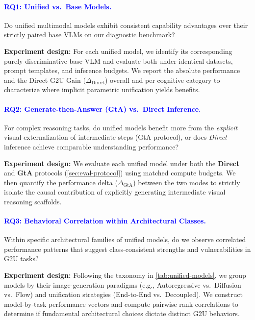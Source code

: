 \documentclass{article}
\theoremstyle{plain}
\theoremstyle{definition}
\theoremstyle{remark}
\begin{document}
\paragraph{\textcolor{blue}{RQ1: Unified vs.\ Base Models.}}
Do unified multimodal models exhibit consistent capability advantages over their strictly paired base VLMs on our diagnostic benchmark?
\par\noindent\textbf{Experiment design:} For each unified model, we identify its corresponding purely discriminative base VLM and evaluate both under identical datasets, prompt templates, and inference budgets. We report the absolute performance and the Direct G2U Gain ($\Delta_{\mathrm{Direct}}$) overall and per cognitive category to characterize where implicit parametric unification yields benefits.

\paragraph{\textcolor{blue}{RQ2: Generate-then-Answer (GtA) vs.\ Direct Inference.}}
For complex reasoning tasks, do unified models benefit more from the \emph{explicit} visual externalization of intermediate steps (GtA protocol), or does \emph{Direct} inference achieve comparable understanding performance?
\par\noindent\textbf{Experiment design:} We evaluate each unified model under both the \textbf{Direct} and \textbf{GtA} protocols (\cref{sec:eval-protocol}) using matched compute budgets. We then quantify the performance delta ($\Delta_{\mathrm{GtA}}$) between the two modes to strictly isolate the causal contribution of explicitly generating intermediate visual reasoning scaffolds.

\paragraph{\textcolor{blue}{RQ3: Behavioral Correlation within Architectural Classes.}}
Within specific architectural families of unified models, do we observe correlated performance patterns that suggest class-consistent strengths and vulnerabilities in G2U tasks?
\par\noindent\textbf{Experiment design:} Following the taxonomy in \cref{tab:unified-models}, we group models by their image-generation paradigms (e.g., Autoregressive vs.\ Diffusion vs.\ Flow) and unification strategies (End-to-End vs.\ Decoupled). We construct model-by-task performance vectors and compute pairwise rank correlations to determine if fundamental architectural choices dictate distinct G2U behaviors.
\end{document}
